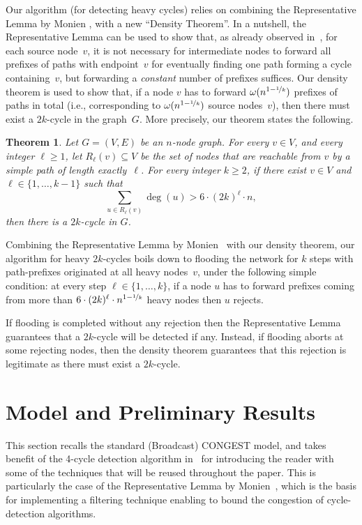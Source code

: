 \documentclass{article}
\newcommand{\lebontau}{6\cdot (2k)^\ell}
\newcommand{\CONGEST}{\textsf{CONGEST}}
\newtheorem{theorem}{Theorem}
\begin{document}
Our algorithm (for detecting heavy cycles) relies on combining the Representative Lemma by Monien \cite{monien85}, with a new ``Density Theorem''. In a nutshell, the Representative Lemma can be used to show that, as already observed in~\cite{FraigniaudO19,KorhonenR17}, for each source node~$v$, it is not necessary for intermediate nodes to forward all prefixes of paths with endpoint~$v$ for eventually finding one path  forming a cycle containing~$v$, but forwarding a \emph{constant} number of prefixes suffices. Our density theorem is used to show that, if a node $v$ has to forward $\omega(n^{1-\nicefrac{1}{k}})$  prefixes of paths in total (i.e., corresponding to $\omega(n^{1-\nicefrac{1}{k}})$ source nodes~$v$), then there must exist a $2k$-cycle in the graph~$G$. More precisely, our theorem states the following.  

\begin{theorem}\label{lem:density}
    Let $G=(V,E)$ be an $n$-node graph. For every $v\in V$, and every integer $\ell\geq 1$, let $R_\ell(v)\subseteq V$ be the set of nodes that are reachable from $v$ by a simple path of length exactly~$\ell$. For every integer $k\geq 2$, if there exist $v\in V$ and $\ell\in\{1,\dots,k-1\}$ such that
    \[\sum_{u\in R_\ell(v)}\deg(u) > \lebontau \cdot n,\]
    then there is a $2k$-cycle in $G$.
\end{theorem}

Combining the Representative Lemma by Monien~\cite{monien85} with our density theorem, our algorithm for heavy $2k$-cycles boils down to flooding the network for $k$ steps with path-prefixes originated at all heavy nodes~$v$, under the following simple condition: at every step $\ell\in\{1,\dots,k\}$, if a node $u$ has to forward prefixes coming from more than $\lebontau \cdot n^{1-\nicefrac{1}{k}}$ heavy nodes then $u$ rejects.

If flooding is completed without any rejection then the Representative Lemma guarantees that a $2k$-cycle will be detected if any. Instead, if flooding aborts at some rejecting nodes, then the density theorem guarantees that this rejection is legitimate as there must exist a $2k$-cycle. 

\section{Model and Preliminary Results}\label{sec:prelim}


This section recalls the standard (Broadcast) \CONGEST\/ model, and takes benefit of the 4-cycle detection algorithm in~\cite{DruckerKO13} for introducing the reader with some of the techniques that will be reused throughout the paper. This is particularly the case of the Representative Lemma by Monien~\cite{monien85}, which is the basis for implementing a filtering technique enabling to bound the congestion of cycle-detection algorithms.
\end{document}

